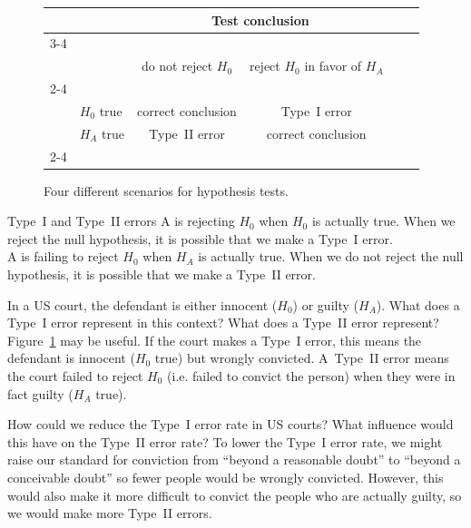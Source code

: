 \begin{figure}[ht]
\centering
\begin{tabular}{l l c c c}
& & \multicolumn{2}{c}{\textbf{Test conclusion}} \\
  \cline{3-4}
\vspace{-3.7mm} \\
& & do not reject $H_0$ &  reject $H_0$ in favor of $H_A$ &
\ \hspace{7mm} \  \\
  \cline{2-4}
\vspace{-3.7mm} \\
& $H_0$ true & correct conclusion &  Type~I error \\
\raisebox{1.5ex}{\textbf{Truth}} & $H_A$ true & Type~II error & correct conclusion \\
  \cline{2-4}
\end{tabular}
\caption{Four different scenarios for hypothesis tests.}
\label{fourHTScenarios}
\end{figure}

\begin{onebox}{Type~I and Type~II errors}
A  is rejecting $H_0$ when $H_0$ is actually true. When we reject the null hypothesis, it is possible that we make a Type~I error. \\[2mm]
A  is failing to reject $H_0$ when $H_A$ is actually true. When we do not reject the null hypothesis, it is possible that we make a Type~II error.\end{onebox}



\begin{examplewrap}
\begin{nexample}{In a US court, the defendant is either innocent ($H_0$) or guilty ($H_A$). What does a Type~I error represent in this context? What does a Type~II error represent? Figure~\ref{fourHTScenarios} may be useful.}
If the court makes a Type~I error, this means the defendant is innocent ($H_0$ true) but wrongly convicted. A~Type~II error means the court failed to reject $H_0$ (i.e. failed to convict the person) when they were in fact guilty ($H_A$ true).
\end{nexample}
\end{examplewrap}

\begin{examplewrap}
\begin{nexample}{How could we reduce the Type~I error rate in US courts? What influence would this have on the Type~II error rate?}
To lower the Type~I error rate, we might raise our standard for conviction from ``beyond a reasonable doubt'' to ``beyond a conceivable doubt'' so fewer people would be wrongly convicted. However, this would also make it more difficult to convict the people who are actually guilty, so we would make more Type~II errors.
\end{nexample}
\end{examplewrap}

